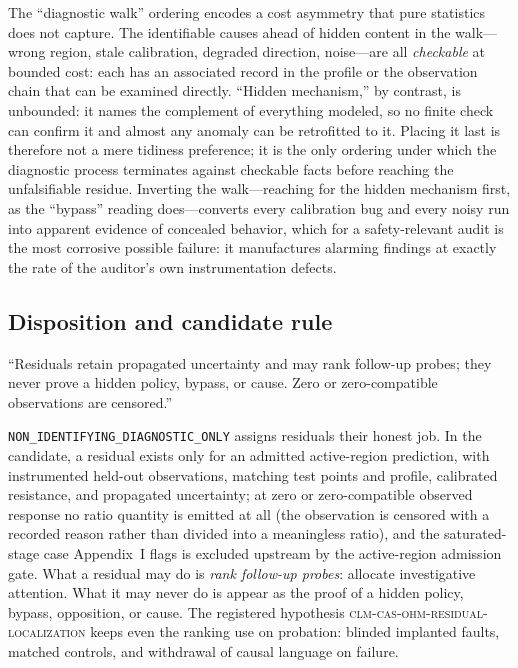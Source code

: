 The ``diagnostic walk'' ordering encodes a cost asymmetry that pure
statistics does not capture. The identifiable
causes ahead of hidden content in the walk---wrong region, stale
calibration, degraded direction, noise---are all \emph{checkable} at bounded
cost: each has an associated record in the profile or the observation chain
that can be examined directly. ``Hidden mechanism,'' by contrast, is
unbounded: it names the complement of everything modeled, so no finite check
can confirm it and almost any anomaly can be retrofitted to it. Placing it
last is therefore not a mere tidiness preference; it is the only ordering
under which the diagnostic process terminates against checkable facts before
reaching the unfalsifiable residue. Inverting the walk---reaching for the
hidden mechanism first, as the ``bypass'' reading does---converts every
calibration bug and every noisy run into apparent evidence of concealed
behavior, which for a safety-relevant audit is the most corrosive possible
failure: it manufactures alarming findings at exactly the rate of the
auditor's own instrumentation defects.

\subsection{Disposition and candidate rule}

\begin{ruleenv}\label{ch04:rule:residual}
``Residuals retain propagated uncertainty and may rank follow-up probes; they
never prove a hidden policy, bypass, or cause. Zero or zero-compatible
observations are censored.''
\end{ruleenv}

\texttt{NON\_IDENTIFYING\_DIAGNOSTIC\_ONLY} assigns residuals their honest
job. In the candidate, a residual exists only for an admitted active-region
prediction, with instrumented held-out observations, matching test points and
profile, calibrated resistance, and propagated uncertainty; at zero or
zero-compatible observed response no ratio quantity is emitted at all (the
observation is censored with a recorded reason rather than divided into a
meaningless ratio), and the saturated-stage case Appendix~I flags is
excluded upstream by the active-region admission gate. What a
residual may do is \emph{rank follow-up probes}: allocate investigative
attention. What it may never do is appear as the proof of a hidden policy,
bypass, opposition, or cause. The registered hypothesis
\textsc{clm-cas-ohm-residual-localization} keeps even the ranking use on
probation: blinded implanted faults, matched controls, and withdrawal of
causal language on failure.

